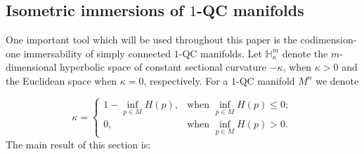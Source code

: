 \documentclass[JEP,XML,SOM,Unicode]{cedram}
\theoremstyle{definition}
\theoremstyle{remark}
\numberwithin{equation}{section}
\begin{document}
\subsection{Isometric immersions of $1$-QC manifolds}\label{section-isometric}
One important tool which will be used throughout this paper
is the codimension-one immersability of simply connected $1$-QC manifolds.
Let $\mathbb H_{\kappa}^m$ denote the $m$-dimensional
hyperbolic space of constant sectional curvature
$-\kappa$, when $\kappa>0$ and the Euclidean space when $\kappa=0$,
respectively. For a $1$-QC manifold $M^n$ we denote

\[ \kappa= \begin{cases}
1-\inf_{p\in M} H(p), &\text{when } \inf_{p\in M}H(p) \leq 0; \\
0, &\text{when } \inf_{p\in M}H(p) > 0.
\end{cases}\]
The main result of this section is:
\end{document}
